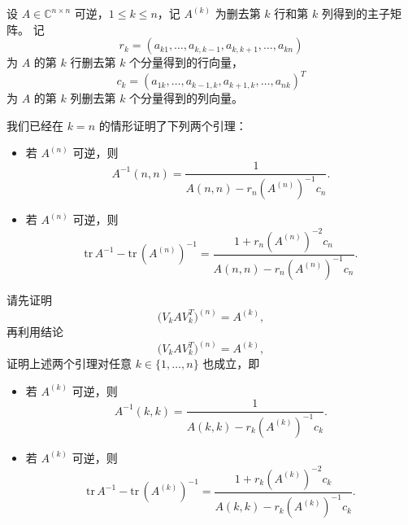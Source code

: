 \begin{10}
    设 $A\in\mathbb{C}^{n\times n}$ 可逆，$1\le k\le n$，记
$A^{(k)}$ 为删去第 $k$ 行和第 $k$ 列得到的主子矩阵。
记
\[
r_k = (a_{k1},\dots,a_{k,k-1},a_{k,k+1},\dots,a_{kn})
\]
为 $A$ 的第 $k$ 行删去第 $k$ 个分量得到的行向量，
\[
c_k = (a_{1k},\dots,a_{k-1,k},a_{k+1,k},\dots,a_{nk})^{T}
\]
为 $A$ 的第 $k$ 列删去第 $k$ 个分量得到的列向量。

我们已经在 $k=n$ 的情形证明了下列两个引理：

\begin{itemize}
  \item[(i)] 若 $A^{(n)}$ 可逆，则
  \[
  A^{-1}(n,n)
    = \frac{1}{A(n,n)-r_n (A^{(n)})^{-1} c_n }.
  \]
  
  \item[(ii)] 若 $A^{(n)}$ 可逆，则
  \[
  \mathrm{tr}\,A^{-1}-\mathrm{tr}\,(A^{(n)})^{-1}
    = \frac{\,1 + r_n (A^{(n)})^{-2} c_n\,}
           {A(n,n)-r_n (A^{(n)})^{-1} c_n }.
  \]
\end{itemize}

请先证明
\[
\bigl(V_k A V_k^{T}\bigr)^{(n)} = A^{(k)},
\]
再利用结论
\[
\bigl(V_k A V_k^{T}\bigr)^{(n)} = A^{(k)},
\]
证明上述两个引理对任意 $k\in\{1,\dots,n\}$ 也成立，即

\begin{itemize}
  \item[(i')] 若 $A^{(k)}$ 可逆，则
  \[
  A^{-1}(k,k)
    = \frac{1}{A(k,k)-r_k (A^{(k)})^{-1} c_k }.
  \]
  
  \item[(ii')] 若 $A^{(k)}$ 可逆，则
  \[
  \mathrm{tr}\,A^{-1}-\mathrm{tr}\,(A^{(k)})^{-1}
    = \frac{\,1 + r_k (A^{(k)})^{-2} c_k\,}
           {A(k,k)-r_k (A^{(k)})^{-1} c_k }.
  \]
\end{itemize}

\end{10}
